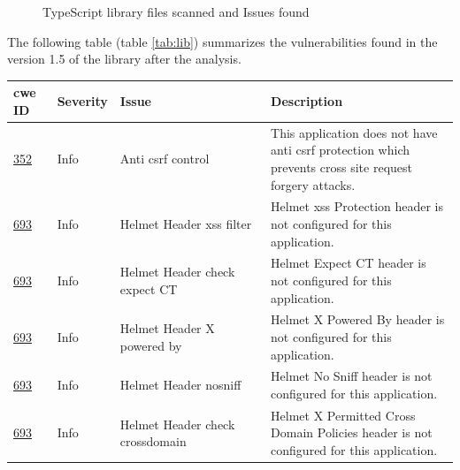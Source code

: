 \newpage
\begin{figure}[h!]
    \centering
    \caption{TypeScript library files scanned and Issues found}
    \label{fig:pie-files}
\end{figure}

The following table (table \ref{tab:lib}) summarizes the vulnerabilities found in the version 1.5 of the library after the analysis.\\
\begin{longtable}{||p{0.1\linewidth} | p{0.11\linewidth} | p{0.35\linewidth} | p{0.45\linewidth}||}
    \hline
    \textbf{\acrshort{cwe} ID}                                  & \textbf{Severity} & \textbf{Issue}                        & \textbf{Description}                                                                                              \\ [0.5ex]
    \hline\hline
    \href{https://cwe.mitre.org/data/definitions/352.html}{352} & Info              & Anti \acrshort{csrf} control          & This application does not have anti \acrshort{csrf} protection which prevents cross site request forgery attacks. \\
    \hline
    \href{https://cwe.mitre.org/data/definitions/693.html}{693} & Info              & Helmet Header \acrshort{xss} filter   & Helmet \acrshort{xss} Protection header is not configured for this application.                                   \\
    \hline
    \href{https://cwe.mitre.org/data/definitions/693.html}{693} & Info              & Helmet Header check expect CT         & Helmet Expect CT header is not configured for this application.                                                   \\
    \hline
    \href{https://cwe.mitre.org/data/definitions/693.html}{693} & Info              & Helmet Header X powered by            & Helmet X Powered By header is not configured for this application.                                                \\
    \hline
    \href{https://cwe.mitre.org/data/definitions/693.html}{693} & Info              & Helmet Header nosniff                 & Helmet No Sniff header is not configured for this application.                                                    \\
    \hline
    \href{https://cwe.mitre.org/data/definitions/693.html}{693} & Info              & Helmet Header check crossdomain       & Helmet X Permitted Cross Domain Policies header is not configured for this application.                           \\

\end{longtable}

